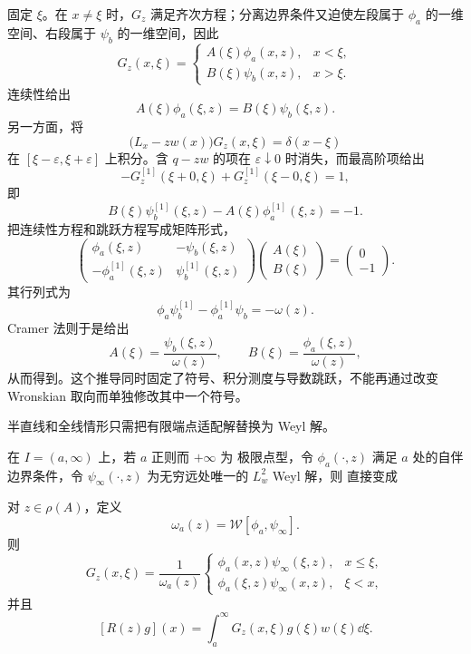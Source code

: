 固定 $\xi$。在 $x\neq\xi$ 时，$G_z$ 满足齐次方程；分离边界条件又迫使左段属于 $\phi_a$ 的一维空间、右段属于 $\psi_b$ 的一维空间，因此
\[
 G_z(x,\xi)=
 \begin{cases}
 A(\xi)\phi_a(x,z),&x<\xi,\\
 B(\xi)\psi_b(x,z),&x>\xi.
 \end{cases}
\]
连续性给出
\[
 A(\xi)\phi_a(\xi,z)=B(\xi)\psi_b(\xi,z).
\]
另一方面，将
\[
 \bigl(L_x-z w(x)\bigr)G_z(x,\xi)=\delta(x-\xi)
\]
在 $[\xi-\varepsilon,\xi+\varepsilon]$ 上积分。含 $q-zw$ 的项在 $\varepsilon\downarrow0$ 时消失，而最高阶项给出
\[
 -G_z^{[1]}(\xi+0,\xi)+G_z^{[1]}(\xi-0,\xi)=1,
\]
即
\[
 B(\xi)\psi_b^{[1]}(\xi,z)-A(\xi)\phi_a^{[1]}(\xi,z)=-1.
\]
把连续性方程和跳跃方程写成矩阵形式，
\[
 \begin{pmatrix}
 \phi_a(\xi,z)&-\psi_b(\xi,z)\\
 -\phi_a^{[1]}(\xi,z)&\psi_b^{[1]}(\xi,z)
 \end{pmatrix}
 \begin{pmatrix}A(\xi)\\B(\xi)\end{pmatrix}
 =\begin{pmatrix}0\\-1\end{pmatrix}.
\]
其行列式为
\[
 \phi_a\psi_b^{[1]}-\phi_a^{[1]}\psi_b=-\omega(z).
\]
Cramer 法则于是给出
\[
 A(\xi)=\frac{\psi_b(\xi,z)}{\omega(z)},
 \qquad
 B(\xi)=\frac{\phi_a(\xi,z)}{\omega(z)},
\]
从而得到。这个推导同时固定了符号、积分测度与导数跳跃，不能再通过改变 Wronskian 取向而单独修改其中一个符号。

半直线和全线情形只需把有限端点适配解替换为 Weyl 解。

在 $I=(a,\infty)$ 上，若 $a$ 正则而 $+\infty$ 为 极限点型，令 $\phi_a(\cdot,z)$ 满足 $a$ 处的自伴边界条件，令 $\psi_\infty(\cdot,z)$ 为无穷远处唯一的 $L^2_w$ Weyl 解，则 直接变成
\begin{theorem}[半直线预解式核]\label{thm:math-sl-green-halfline}
对 $z\in\rho(A)$，定义
\[
 \omega_a(z)=\mathcal W[\phi_a,\psi_\infty].
\]
则
\begin{equation*}G_z(x,\xi)=\frac{1}{\omega_a(z)}
 \begin{cases}
 \phi_a(x,z)\psi_\infty(\xi,z),&x\le\xi,\\
 \phi_a(\xi,z)\psi_\infty(x,z),&\xi<x,
 \end{cases}
\end{equation*}
并且
\[
 [R(z)g](x)=\int_a^\infty G_z(x,\xi)g(\xi)w(\xi)\dd\xi.
\]
\end{theorem}

